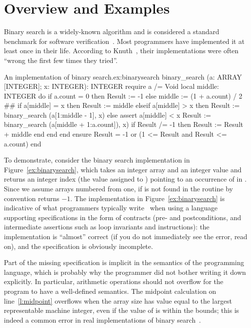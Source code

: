 \section{Overview and Examples}
\label{sec:ap-overview}



Binary search is a widely-known algorithm and is considered a standard benchmark for software verification~\cite{VSI08}.
Most programmers have im\-ple\-men\-ted it at least once in their life.
According to Knuth~\cite[Vol.~3, Sec.~6.2.1]{KNUTH11}, their implementations were often ``wrong the first few times they tried''.

\begin{efigure}[ht]{An implementation of binary search.}{ex:binarysearch}
binary_search (a: ARRAY [INTEGER]; x: INTEGER): INTEGER
	require a /= Void
	local middle: INTEGER
	do
		if a.count = 0 then
			Result := -1
		else
			middle := (1 + a.count) / 2 #\label{l:midpoint}#
			if a[middle] = x then
				Result := middle
			elseif a[middle] > x then
				Result := binary_search (a[1:middle - 1], x)
			else
				assert a[middle] < x
				Result := binary_search (a[middle + 1:a.count]), x)
				if Result /= -1 then	Result := Result + middle end
			end
		end
	ensure Result = -1 or (1 <= Result and Result <= a.count)
	end
\end{efigure}

To demonstrate, consider the binary search implementation in Figure~\ref{ex:binarysearch}, which takes an integer array  and an integer value  and returns an integer index (the value assigned to ) pointing to an occurrence of  in .
Since we assume arrays numbered from one, if  is not found in  the routine by convention returns $-1$.
The implementation in Figure~\ref{ex:binarysearch} is indicative of what programmers typically write~\cite{POLIKARPOVA09,ESTLER14} when using a language supporting specifications in the form of contracts (pre- and postconditions, and intermediate assertions such as loop invariants and  instructions): the implementation is ``almost'' correct (if you do not immediately see the error, read on), and the specification is obviously incomplete.

Part of the missing specification is implicit in the semantics of the programming language, which is probably why the programmer did not bother writing it down explicitly.
In particular, arithmetic operations should not overflow for the program to have a well-defined semantics.
The midpoint calculation on line~\ref{l:midpoint} overflows when the array size  has value equal to the largest representable machine integer, even if the value of  is within the bounds; this is indeed a common error in real implementations of binary search~\cite{BLOCH06}.

